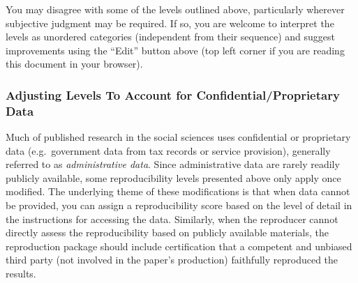 \documentclass[
]{book}
\begin{document}
You may disagree with some of the levels outlined above, particularly wherever subjective judgment may be required. If so, you are welcome to interpret the levels as unordered categories (independent from their sequence) and suggest improvements using the ``Edit'' button above (top left corner if you are reading this document in your browser).

\hypertarget{adjusting-levels-to-account-for-confidentialproprietary-data}{%
\subsubsection*{Adjusting Levels To Account for Confidential/Proprietary Data}\label{adjusting-levels-to-account-for-confidentialproprietary-data}}

Much of published research in the social sciences uses confidential or proprietary data (e.g.~government data from tax records or service provision), generally referred to as \emph{administrative data}. Since administrative data are rarely readily publicly available, some reproducibility levels presented above only apply once modified. The underlying theme of these modifications is that when data cannot be provided, you can assign a reproducibility score based on the level of detail in the instructions for accessing the data. Similarly, when the reproducer cannot directly assess the reproducibility based on publicly available materials, the reproduction package should include certification that a competent and unbiased third party (not involved in the paper's production) faithfully reproduced the results.
\end{document}
